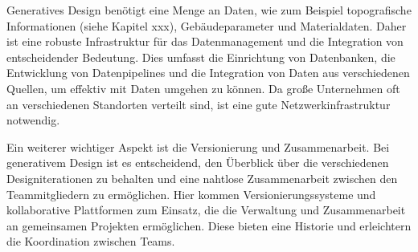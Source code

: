 Generatives Design benötigt eine Menge an Daten, wie zum Beispiel topografische Informationen (siehe Kapitel xxx), Gebäudeparameter und Materialdaten. Daher ist eine robuste Infrastruktur für das Datenmanagement und die Integration von entscheidender Bedeutung. Dies umfasst die Einrichtung von Datenbanken, die Entwicklung von Datenpipelines und die Integration von Daten aus verschiedenen Quellen, um effektiv mit Daten umgehen zu können. Da große Unternehmen oft an verschiedenen Standorten verteilt sind, ist eine gute Netzwerkinfrastruktur notwendig. 

Ein weiterer wichtiger Aspekt ist die Versionierung und Zusammenarbeit. Bei generativem Design ist es entscheidend, den Überblick über die verschiedenen Designiterationen zu behalten und eine nahtlose Zusammenarbeit zwischen den Teammitgliedern zu ermöglichen. Hier kommen Versionierungssysteme und kollaborative Plattformen zum Einsatz, die die Verwaltung und Zusammenarbeit an gemeinsamen Projekten ermöglichen. Diese bieten eine Historie und erleichtern die Koordination zwischen Teams.

